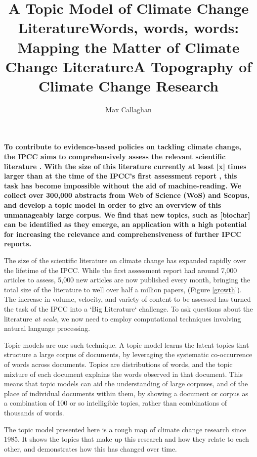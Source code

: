 \documentclass{article}
\title{A Topic Model of Climate Change Literature}
\title{Words, words, words: Mapping the Matter of Climate Change Literature}
\title{A Topography of Climate Change Research}
\author{Max Callaghan}
\begin{document}
\maketitle
\textbf{
To contribute to evidence-based policies on tackling climate change, the IPCC aims to comprehensively assess the relevant scientific literature \citep{IPCC2013}. With the size of this literature currently at least [x] times larger than at the time of the IPCC's first assessment report \citep{Houghton1990ClimateAssessment}, this task has become impossible without the aid of machine-reading. We collect over 300,000 abstracts from Web of Science (WoS) and Scopus, and develop a topic model in order to give an overview of this unmanageably large corpus. We find that new topics, such as [biochar] can be identified as they emerge, an application with a high potential for increasing the relevance and comprehensiveness of further IPCC reports.
}

The size of the scientific literature on climate change has expanded rapidly over the lifetime of the IPCC. While the first assessment report had around 7,000 articles to assess, 5,000 new articles are now published every month, bringing the total size of the literature to well over half a million papers, (Figure \ref{growth}). The increase in volume, velocity, and variety of content to be assessed has turned the task of the IPCC into a `Big Literature` challenge. To ask questions about the literature \textit{at scale}, we now need to employ computational techniques involving natural language processing.

Topic models are one such technique. A topic model learns the latent topics that structure a large corpus of documents, by leveraging the systematic co-occurrence of words across documents. Topics are distributions of words, and the topic mixture of each document explains the words observed in that document. This means that topic models can aid the understanding of large corpuses, and of the place of individual documents within them, by showing a document or corpus as a combination of 100 or so intelligible topics, rather than combinations of thousands of words.

The topic model presented here is a rough map of climate change research since 1985. It shows the topics that make up this research and how they relate to each other, and demonstrates how this has changed over time.
\end{document}
